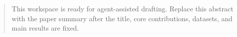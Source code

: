 \begin{abstract}
This workspace is ready for agent-assisted drafting. Replace this abstract with the paper summary after the title, core contributions, datasets, and main results are fixed.
\end{abstract}

